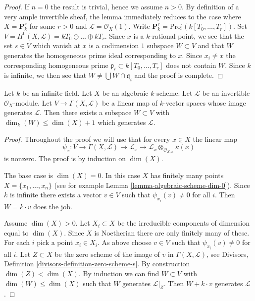 \begin{proof}
If $n = 0$ the result is trivial, hence we assume $n > 0$.
By definition of a very ample invertible sheaf, the lemma immediately
reduces to the case where $X = \mathbf{P}^r_k$ for some $r > 0$
and $\mathcal{L} = \mathcal{O}_X(1)$. Write
$\mathbf{P}^r_k = \text{Proj}(k[T_0, \ldots, T_r])$.
Set $V = H^0(X, \mathcal{L}) = kT_0 \oplus \ldots \oplus kT_r$.
Since $x$ is a $k$-rational point, we see that the set
$s \in V$ which vanish at $x$ is a codimension $1$ subspace
$W \subset V$ and that $W$ generates the homogeneous prime
ideal corresponding to $x$. Since $x_i \not = x$ the corresponding
homogeneous prime $\mathfrak p_i \subset k[T_0, \ldots, T_r]$ does
not contain $W$. Since $k$ is infinite, we then see that
$W \not = \bigcup W \cap \mathfrak q_i$ and the proof is complete.
\end{proof}

\begin{lemma}
\label{lemma-generated-by-dim-plus-1-sections}
Let $k$ be an infinite field. Let $X$ be an algebraic $k$-scheme.
Let $\mathcal{L}$ be an invertible $\mathcal{O}_X$-module.
Let $V \to \Gamma(X, \mathcal{L})$ be a linear map of $k$-vector spaces
whose image generates $\mathcal{L}$. Then there exists a subspace
$W \subset V$ with $\dim_k(W) \leq \dim(X) + 1$ which generates $\mathcal{L}$.
\end{lemma}

\begin{proof}
Throughout the proof we will use that for every $x \in X$
the linear map
$$
\psi_x : V \to \Gamma(X, \mathcal{L}) \to \mathcal{L}_x \to
\mathcal{L}_x \otimes_{\mathcal{O}_{X, x}} \kappa(x)
$$
is nonzero. The proof is by induction on $\dim(X)$.

\medskip\noindent
The base case is $\dim(X) = 0$. In this case $X$ has finitely many points
$X = \{x_1, \ldots, x_n\}$ (see for example
Lemma \ref{lemma-algebraic-scheme-dim-0}). Since $k$ is infinite
there exists a vector $v \in V$ such that $\psi_{x_i}(v) \not = 0$
for all $i$. Then $W = k\cdot v$ does the job.

\medskip\noindent
Assume $\dim(X) > 0$. Let $X_i \subset X$ be the irreducible components
of dimension equal to $\dim(X)$. Since $X$ is Noetherian there are only
finitely many of these. For each $i$ pick a point $x_i \in X_i$.
As above choose $v \in V$ such that $\psi_{x_i}(v) \not = 0$
for all $i$. Let $Z \subset X$ be the zero scheme of the image
of $v$ in $\Gamma(X, \mathcal{L})$, see
Divisors, Definition \ref{divisors-definition-zero-scheme-s}.
By construction $\dim(Z) < \dim(X)$. By induction we can find
$W \subset V$ with $\dim(W) \leq \dim(X)$ such that $W$ generates
$\mathcal{L}|_Z$. Then $W + k\cdot v$ generates $\mathcal{L}$.
\end{proof}






